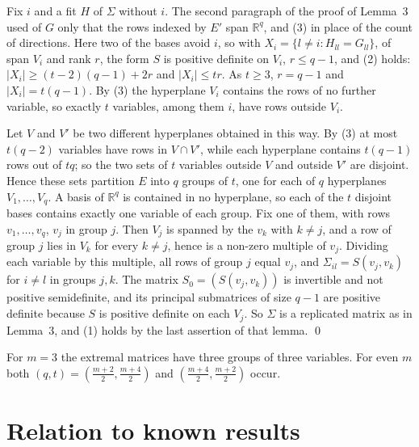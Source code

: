 \documentclass[11pt,letterpaper,reqno]{amsart}
\theoremstyle{spaced}
\begin{document}
Fix \(i\) and a fit \(H\) of \(\Sigma\) without \(i\). The second paragraph of the proof of Lemma~3 used of \(G\) only that the rows indexed by \(E'\) span \(\mathbb{R}^q\), and (3) in place of the count of directions. Here two of the bases avoid \(i\), so with \(X_i = \{l \ne i : H_{ll} = G_{ll}\}\), of span \(V_i\) and rank \(r\), the form \(S\) is positive definite on \(V_i\), \(r \le q-1\), and (2) holds: \(\lvert X_i\rvert \ge (t-2)(q-1) + 2r\) and \(\lvert X_i\rvert \le tr\). As \(t \ge 3\), \(r = q-1\) and \(\lvert X_i\rvert = t(q-1)\). By (3) the hyperplane \(V_i\) contains the rows of no further variable, so exactly \(t\) variables, among them \(i\), have rows outside \(V_i\).

Let \(V\) and \(V'\) be two different hyperplanes obtained in this way. By (3) at most \(t(q-2)\) variables have rows in \(V \cap V'\), while each hyperplane contains \(t(q-1)\) rows out of \(tq\); so the two sets of \(t\) variables outside \(V\) and outside \(V'\) are disjoint. Hence these sets partition \(E\) into \(q\) groups of \(t\), one for each of \(q\) hyperplanes \(V_1, \dots, V_q\). A basis of \(\mathbb{R}^q\) is contained in no hyperplane, so each of the \(t\) disjoint bases contains exactly one variable of each group. Fix one of them, with rows \(v_1, \dots, v_q\), \(v_j\) in group \(j\). Then \(V_j\) is spanned by the \(v_k\) with \(k \ne j\), and a row of group \(j\) lies in \(V_k\) for every \(k \ne j\), hence is a non-zero multiple of \(v_j\). Dividing each variable by this multiple, all rows of group \(j\) equal \(v_j\), and \(\Sigma_{il} = S(v_j, v_k)\) for \(i \ne l\) in groups \(j, k\). The matrix \(S_0 = (S(v_j, v_k))\) is invertible and not positive semidefinite, and its principal submatrices of size \(q-1\) are positive definite because \(S\) is positive definite on each \(V_j\). So \(\Sigma\) is a replicated matrix as in Lemma~3, and (1) holds by the last assertion of that lemma. \qed

For \(m = 3\) the extremal matrices have three groups of three variables. For even \(m\) both \((q, t) = (\tfrac{m+2}{2}, \tfrac{m+4}{2})\) and \((\tfrac{m+4}{2}, \tfrac{m+2}{2})\) occur.

\hypertarget{relation-to-known-results}{%
\section{Relation to known results}\label{relation-to-known-results}}
\end{document}
